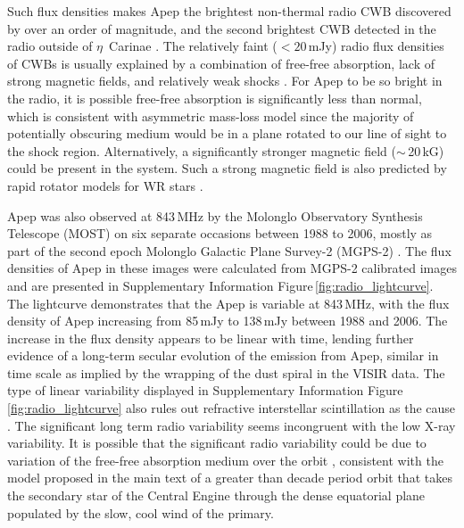 \documentclass[preprint,times]{aastex61}
\begin{document}
Such flux densities makes Apep the brightest non-thermal radio CWB discovered by over an order of magnitude, and the second brightest CWB detected in the radio outside of $\eta$~Carinae \citep{2013A&A...558A..28D}. The relatively faint ($< 20$\,mJy) radio flux densities of CWBs is usually explained by a combination of free-free absorption, lack of strong magnetic fields, and relatively weak shocks \citep{2002ApJ...566..399M,2013A&A...558A..28D}. For Apep to be so bright in the radio, it is possible free-free absorption is significantly less than normal, which is consistent with asymmetric mass-loss model since the majority of potentially obscuring medium would be in a plane rotated to our line of sight to the shock region. Alternatively, a significantly stronger magnetic field ($\sim$\,20\,kG) could be present in the system. Such a strong magnetic field is also predicted by rapid rotator models for WR stars \citep{2014A&A...562A.118S}.

Apep was also observed at 843\,MHz by the Molonglo Observatory Synthesis Telescope (MOST) on six separate occasions between 1988 to 2006, mostly as part of the second epoch Molonglo Galactic Plane Survey-2 (MGPS-2) \citep{Bock1999,Murphy2007}. The flux densities of Apep in these images were calculated from MGPS-2 calibrated images and are presented in Supplementary Information Figure\,\ref{fig:radio_lightcurve}. The lightcurve demonstrates that the Apep is variable at 843\,MHz, with the flux density of Apep increasing from 85\,mJy to 138\,mJy between 1988 and 2006. The increase in the flux density appears to be linear with time, lending further evidence of a long-term secular evolution of the emission from Apep, similar in time scale as implied by the wrapping of the dust spiral in the VISIR data. The type of linear variability displayed in Supplementary Information Figure\,\ref{fig:radio_lightcurve} also rules out refractive interstellar scintillation as the cause \citep{Rickett1984}. The significant long term radio variability seems incongruent with the low X-ray variability. It is possible that the significant radio variability could be due to variation of the free-free absorption medium over the orbit \citep{2015A&A...579A..99B}, consistent with the model proposed in the main text of a greater than decade period orbit that takes the secondary star of the Central Engine through the dense equatorial plane populated by the slow, cool wind of the primary. 
\end{document}
